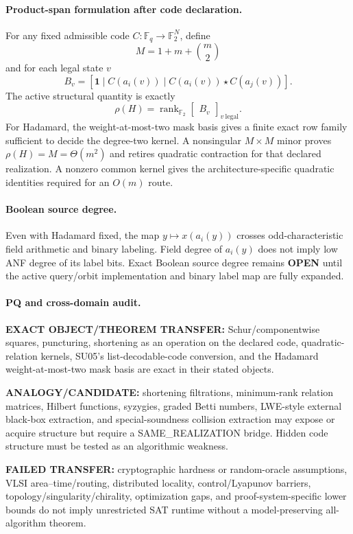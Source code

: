 \documentclass[11pt]{article}
\begin{document}
\paragraph{Product-span formulation after code declaration.}
For any fixed admissible code $C:\mathbb F_q\to\mathbb F_2^N$, define
\[
M=1+m+\binom m2
\]
and for each legal state $v$
\[
B_v=
[\mathbf1\mid C(a_i(v))\mid C(a_i(v))\star C(a_j(v))].
\]
The active structural quantity is exactly
\[
\rho(H)=\operatorname{rank}_{\mathbb F_2}\begin{bmatrix}B_v\end{bmatrix}_{v\ \mathrm{legal}}.
\]
For Hadamard, the weight-at-most-two mask basis gives a finite exact row family sufficient to decide the degree-two kernel. A nonsingular $M\times M$ minor proves $\rho(H)=M=\Theta(m^2)$ and retires quadratic contraction for that declared realization. A nonzero common kernel gives the architecture-specific quadratic identities required for an $O(m)$ route.

\paragraph{Boolean source degree.}
Even with Hadamard fixed, the map $y\mapsto x(a_i(y))$ crosses odd-characteristic field arithmetic and binary labeling. Field degree of $a_i(y)$ does not imply low ANF degree of its label bits. Exact Boolean source degree remains \textbf{OPEN} until the active query/orbit implementation and binary label map are fully expanded.

\paragraph{PQ and cross-domain audit.}
\textbf{EXACT OBJECT/THEOREM TRANSFER:} Schur/componentwise squares, puncturing, shortening as an operation on the declared code, quadratic-relation kernels, SU05's list-decodable-code conversion, and the Hadamard weight-at-most-two mask basis are exact in their stated objects.

\textbf{ANALOGY/CANDIDATE:} shortening filtrations, minimum-rank relation matrices, Hilbert functions, syzygies, graded Betti numbers, LWE-style external black-box extraction, and special-soundness collision extraction may expose or acquire structure but require a SAME\_REALIZATION bridge. Hidden code structure must be tested as an algorithmic weakness.

\textbf{FAILED TRANSFER:} cryptographic hardness or random-oracle assumptions, VLSI area--time/routing, distributed locality, control/Lyapunov barriers, topology/singularity/chirality, optimization gaps, and proof-system-specific lower bounds do not imply unrestricted SAT runtime without a model-preserving all-algorithm theorem.
\end{document}

